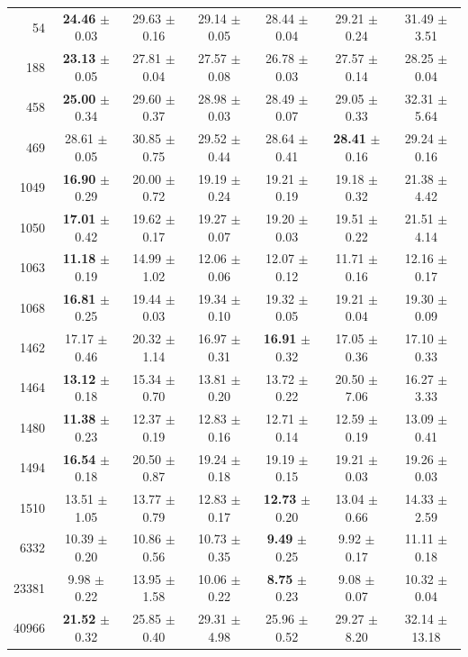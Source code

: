 \begin{table}[t]
\begin{tabular*}{\textwidth}{@{\extracolsep{\fill}}rcccccc@{}}
54 & \textbf{24.46} $\pm$ 0.03 & 29.63 $\pm$ 0.16 & 29.14 $\pm$ 0.05 & 28.44 $\pm$ 0.04 & 29.21 $\pm$ 0.24 & 31.49 $\pm$ 3.51 \\
188 & \textbf{23.13} $\pm$ 0.05 & 27.81 $\pm$ 0.04 & 27.57 $\pm$ 0.08 & 26.78 $\pm$ 0.03 & 27.57 $\pm$ 0.14 & 28.25 $\pm$ 0.04 \\
458 & \textbf{25.00} $\pm$ 0.34 & 29.60 $\pm$ 0.37 & 28.98 $\pm$ 0.03 & 28.49 $\pm$ 0.07 & 29.05 $\pm$ 0.33 & 32.31 $\pm$ 5.64 \\
469 & 28.61 $\pm$ 0.05 & 30.85 $\pm$ 0.75 & 29.52 $\pm$ 0.44 & 28.64 $\pm$ 0.41 & \textbf{28.41} $\pm$ 0.16 & 29.24 $\pm$ 0.16 \\
1049 & \textbf{16.90} $\pm$ 0.29 & 20.00 $\pm$ 0.72 & 19.19 $\pm$ 0.24 & 19.21 $\pm$ 0.19 & 19.18 $\pm$ 0.32 & 21.38 $\pm$ 4.42 \\
1050 & \textbf{17.01} $\pm$ 0.42 & 19.62 $\pm$ 0.17 & 19.27 $\pm$ 0.07 & 19.20 $\pm$ 0.03 & 19.51 $\pm$ 0.22 & 21.51 $\pm$ 4.14 \\
1063 & \textbf{11.18} $\pm$ 0.19 & 14.99 $\pm$ 1.02 & 12.06 $\pm$ 0.06 & 12.07 $\pm$ 0.12 & 11.71 $\pm$ 0.16 & 12.16 $\pm$ 0.17 \\
1068 & \textbf{16.81} $\pm$ 0.25 & 19.44 $\pm$ 0.03 & 19.34 $\pm$ 0.10 & 19.32 $\pm$ 0.05 & 19.21 $\pm$ 0.04 & 19.30 $\pm$ 0.09 \\
1462 & 17.17 $\pm$ 0.46 & 20.32 $\pm$ 1.14 & 16.97 $\pm$ 0.31 & \textbf{16.91} $\pm$ 0.32 & 17.05 $\pm$ 0.36 & 17.10 $\pm$ 0.33 \\
1464 & \textbf{13.12} $\pm$ 0.18 & 15.34 $\pm$ 0.70 & 13.81 $\pm$ 0.20 & 13.72 $\pm$ 0.22 & 20.50 $\pm$ 7.06 & 16.27 $\pm$ 3.33 \\
1480 & \textbf{11.38} $\pm$ 0.23 & 12.37 $\pm$ 0.19 & 12.83 $\pm$ 0.16 & 12.71 $\pm$ 0.14 & 12.59 $\pm$ 0.19 & 13.09 $\pm$ 0.41 \\
1494 & \textbf{16.54} $\pm$ 0.18 & 20.50 $\pm$ 0.87 & 19.24 $\pm$ 0.18 & 19.19 $\pm$ 0.15 & 19.21 $\pm$ 0.03 & 19.26 $\pm$ 0.03 \\
1510 & 13.51 $\pm$ 1.05 & 13.77 $\pm$ 0.79 & 12.83 $\pm$ 0.17 & \textbf{12.73} $\pm$ 0.20 & 13.04 $\pm$ 0.66 & 14.33 $\pm$ 2.59 \\
6332 & 10.39 $\pm$ 0.20 & 10.86 $\pm$ 0.56 & 10.73 $\pm$ 0.35 & \textbf{9.49} $\pm$ 0.25 & 9.92 $\pm$ 0.17 & 11.11 $\pm$ 0.18 \\
23381 & 9.98 $\pm$ 0.22 & 13.95 $\pm$ 1.58 & 10.06 $\pm$ 0.22 & \textbf{8.75} $\pm$ 0.23 & 9.08 $\pm$ 0.07 & 10.32 $\pm$ 0.04 \\
40966 & \textbf{21.52} $\pm$ 0.32 & 25.85 $\pm$ 0.40 & 29.31 $\pm$ 4.98 & 25.96 $\pm$ 0.52 & 29.27 $\pm$ 8.20 & 32.14 $\pm$ 13.18 \\

\end{tabular*}
\end{table}
